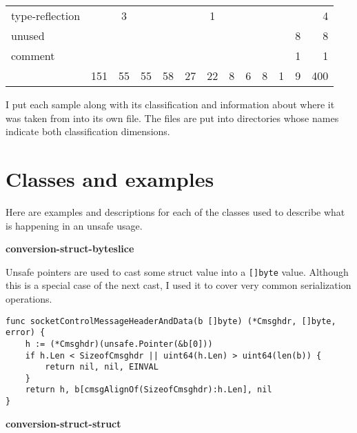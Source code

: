 \begin{table}[h]
\begin{tabularx}{\textwidth}{Xccccccccccc|r}
        \rowcolor{verylightgray}
                          type-reflection &       &   3 &     &      &     &   1 &    &     &    &    &    &    4 \\
                                   unused &       &     &     &      &     &     &    &     &    &    &  8 &    8 \\
        \rowcolor{verylightgray}
                                  comment &       &     &     &      &     &     &    &     &    &    &  1 &    1 \\
                                       {} &   151 &  55 &  55 &   58 &  27 &  22 &  8 &   6 &  8 &  1 &  9 &  400 \\
        \bottomrule
    \end{tabularx}
\end{table}

I put each sample along with its classification and information about where it was taken from into its own file.
The files are put into directories whose names indicate both classification dimensions.



\section{Classes and examples}\label{sec:survey-small-classes}

Here are examples and descriptions for each of the classes used to describe what is happening in an unsafe usage.

\textbf{conversion-struct-byteslice}

Unsafe pointers are used to cast some struct value into a \texttt{[]byte} value.
Although this is a special case of the next cast, I used it to cover very common serialization operations.

\begin{lstlisting}[language=Golang, label=lst:survey-small-classexample-conversion-struct-byteslice, caption=Usage class example: conversion-struct-byteslice]
func socketControlMessageHeaderAndData(b []byte) (*Cmsghdr, []byte, error) {
    h := (*Cmsghdr)(unsafe.Pointer(&b[0]))
    if h.Len < SizeofCmsghdr || uint64(h.Len) > uint64(len(b)) {
        return nil, nil, EINVAL
    }
    return h, b[cmsgAlignOf(SizeofCmsghdr):h.Len], nil
}
\end{lstlisting}


\textbf{conversion-struct-struct}

